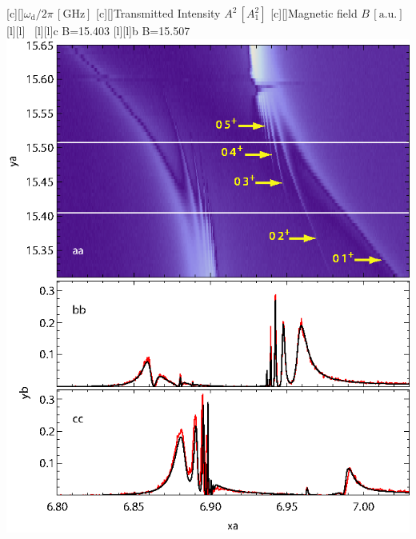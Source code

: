 

 \figstyle
 [c][]{$\omega_\text{d}/2\pi\,[\text{GHz}]$}
 [c][]{Transmitted Intensity $A^2\,[A_1^2]$}
 [c][]{Magnetic field $B\,[\text{a.u.}]$}
 [l][l]{\panelstyle\textcolor{white}{a}}
 [l][l]{{\panelstyle c } B=15.403}
 [l][l]{{\panelstyle b } B=15.507}
 \includegraphics[height=4 in]{wolverine.eps}


